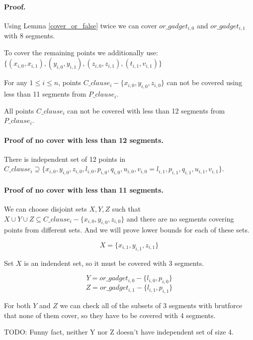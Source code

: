 \paragraph{Proof.}
Using Lemma \ref{cover_or_false} twice we can
cover $or\_gadget_{i,0}$ and  $or\_gadget_{i,1}$
with 8 segments.

To cover the remaining points we additionally use:
$\{ (x_{i, 0}, x_{i, 1}), (y_{i, 0}, y_{i, 1}),
(z_{i, 0}, z_{i, 1}), (t_{i, 1}, v_{i, 1}) \}$


\begin{lemma}
\label{cover_clauses_segments_no_less}
For any $1 \le i \le n$,
points $C\_clause_i - \{ x_{i, 0}, y_{i, 0}, z_{i, 0}\}$
can not be covered using less than 11 segments from $P\_clause_i$.

All points $C\_clause_i$ can not be covered with less than 12 segments
from $P\_clause_i$.
\end{lemma}


\paragraph{Proof of no cover with less than 12 segments.}
There is independent set of 12 points in $C\_clause_i \supseteq
\{ x_{i, 0}, y_{i, 0}, z_{i, 0}, l_{i, 0}, p_{i, 0}, q_{i, 0},
u_{i, 0}, v_{i, 0} = l_{i, 1}, p_{i, 1}, q_{i, 1}, u_{i, 1}, v_{i, 1} \}$.

\paragraph{Proof of no cover with less than 11 segments.}

We can choose disjoint sets $X, Y, Z$ such that
$X \cup Y \cup Z \subseteq C\_clause_i - \{x_{i, 0}, y_{i, 0}, z_{i, 0}\}$
and there are no segments covering points from different sets.
And we will prove lower bounds for each of these sets.

$$X = \{x_{i, 1}, y_{i, 1}, z_{i, 1}\}$$

Set $X$ is an indendent set, so it must be covered with 3 segments.

$$Y = or\_gadget_{i, 0} - \{l_{i, 0}, p_{i, 0}\}$$
$$Z = or\_gadget_{i, 1} - \{l_{i, 1}, p_{i, 1}\}$$


For both $Y$ and $Z$ we can check all of the subsets of 3 segments
with brutforce that none of them cover, so they have to be covered with
4 segments.

TODO: Funny fact, neither Y nor Z doesn't have independent set of size 4.

